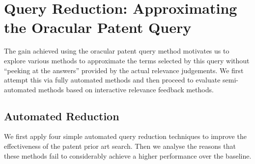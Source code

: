 \section{Query Reduction: Approximating the Oracular Patent Query}
\label{sec: QR}
The gain achieved using the oracular patent query method motivates us to explore various methods to approximate the terms
selected by this query without ``peeking at the answers'' provided by
the actual relevance judgements.  We first attempt this via fully
automated methods and then proceed to evaluate semi-automated methods
based on interactive relevance feedback methods.
\subsection{Automated Reduction}
\label{AutomatedReduction}
We first apply four simple automated query reduction techniques to improve the effectiveness of the patent prior art search. Then we analyse the reasons that these methods fail to considerably achieve a higher performance over the baseline.
